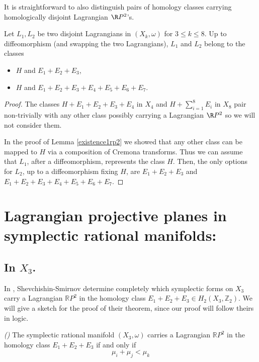 It is straightforward to also distinguish pairs of homology classes carrying homologically disjoint Lagrangian $\R P^2$'s. 

\begin{lemma}\label{existence2rp2}
Let $L_1,L_2$ be two disjoint Lagrangians in $(X_k,\omega)$ for $3\leq k\leq 8$. Up to diffeomorphism (and swapping the two Lagrangians),  $L_1$ and $L_2$ belong to the classes
\begin{itemize}
    \item $H$ and $E_1+E_2+E_3$,
    \item $H$ and $E_1+E_2+E_3+E_4+E_5+E_6+E_7$.
\end{itemize}
\end{lemma}



\begin{proof}
The classes $H+E_1+E_2+E_3+E_4$ in $X_4$ and  $H+\sum_{i=1}^8 E_i$ in $X_8$ pair non-trivially with any other class possibly carrying a Lagrangian $\R P^2$ so we will not consider them.\par 

In the proof of Lemma \ref{existence1rp2} we showed that any other class can  be mapped to $H$ via a composition of Cremona transforms. Thus we can assume that $L_1$, after a diffeomorphism, represents the class $H$. Then, the only options for $L_2$, up to a diffeomorphism fixing $H$,  are $E_1+E_2+E_3$ and $E_1+E_2+E_3+E_4+E_5+E_6+E_7$.
\end{proof}




\section{Lagrangian projective planes in symplectic rational manifolds:}


\subsection{In $X_3$.}
In \cite{SS}, Shevchishin-Smirnov determine completely which symplectic forms on $X_3$ carry a Lagrangian $\mathbb{R}P^2$ in the homology class $E_1+E_2+E_3\in H_2(X_3,\mathbb{Z}_2)$. We will give a sketch for the proof of their theorem, since our proof will follow theirs in logic.

\begin{Theorem}\emph{(\cite{SS})}\label{thrmss}
The symplectic rational manifold $(X_3,\omega)$ carries a Lagrangian $\mathbb{R}P^2$ in the homology class $E_1+E_2+E_3$ if and only if 
\[\mu_i+\mu_j<\mu_k\]
\end{Theorem}

